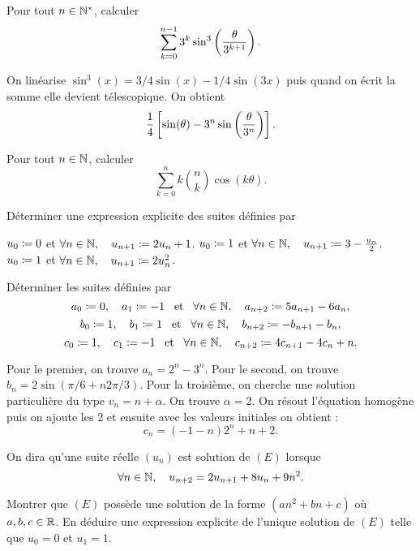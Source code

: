 \documentclass{magnolia}
\begin{document}
Pour tout $n\in{\mathbb{N}^*}$, calculer
\[\sum_{k=0}^{n-1} 3^k \sin^3 \left(\frac{\theta}{3^{k+1}}\right).\]

\begin{sol}
On linéarise $\sin^3(x)=3/4\sin(x)-1/4\sin(3x)$ puis quand on écrit la somme elle devient télescopique. On obtient
\[\frac{1}{4}\left[\sin(\theta)-3^n\sin\left(\frac{\theta}{3^n}\right)\right].\]
\end{sol}

Pour tout $n\in\mathbb{N}$, calculer
\[\sum_{k=0}^n k\binom{n}{k}\cos (k \theta).\]


Déterminer une expression explicite des suites définies par
\begin{questions}
\question $u_0\coloneqq 0$ et $\forall n\in\mathbb{N},\quad u_{n+1}\coloneqq 2 u_n+1$.
\question $u_0\coloneqq 1$ et $\forall n\in\mathbb{N},\quad u_{n+1}\coloneqq 3 - \frac{u_n}{2}$.
\question $u_0\coloneqq 1$ et $\forall n\in\mathbb{N},\quad u_{n+1}\coloneqq 2 u_n^2$.
\end{questions}



Déterminer les suites définies par
\[a_0\coloneqq 0,\quad a_1\coloneqq -1 \quad\!\text{et}\quad\! \forall n\in\mathbb{N},\quad a_{n + 2} \coloneqq 5a_{n + 1}-6a_n,\]
\[b_0\coloneqq 1,\quad b_1\coloneqq 1 \quad\!\text{et}\quad\! \forall n\in\mathbb{N},\quad b_{n + 2} \coloneqq -b_{n + 1}-b_n,\]
\[c_0\coloneqq 1,\quad c_1\coloneqq -1 \quad\!\text{et}\quad\! \forall n\in\mathbb{N},\quad c_{n + 2} \coloneqq 4c_{n + 1}-4c_n+n.\]

\begin{sol}
Pour le premier, on trouve $a_n=2^n-3^n$. Pour le second, on trouve $b_n=2\sin(\pi/6+n2\pi/3)$.
Pour la troisième, on cherche une solution particulière du type $v_n=n+\alpha$. On trouve $\alpha=2$. On résout l'équation homogène puis on ajoute les $2$ et ensuite avec les valeurs initiales on obtient :
$$c_n=(-1-n)2^n+n+2.$$
\end{sol}

On dira qu'une suite réelle $(u_n)$ est solution de $(E)$ lorsque
\[\forall n\in\mathbb{N},\quad u_{n+2}=2u_{n+1}+8u_n+9n^2.\]
\begin{questions}
\question Montrer que $(E)$ possède une solution de la forme $(an^2+bn+c)$ où $a,b,c\in\mathbb{R}$.
\question En déduire une expression explicite de l'unique solution de $(E)$ telle que $u_0=0$ et $u_1=1$.
\end{questions}
\end{document}
